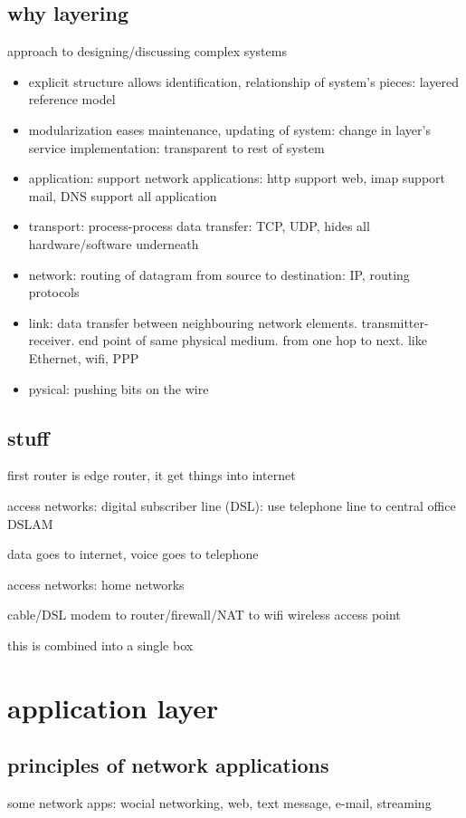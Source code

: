\documentclass[10pt]{article}
\theoremstyle{break}
\begin{document}
\subsection{why layering}
approach to designing/discussing complex systems 
\begin{itemize}
    \item explicit structure allows identification, relationship of system's pieces: layered reference model 
    \item modularization eases maintenance, updating of system: change in layer's service implementation: transparent to rest of system
\end{itemize}

\begin{itemize}
    \item application: support network applications: http support web, imap support mail, DNS support all application 
    \item transport: process-process data transfer: TCP, UDP, hides all hardware/software underneath 
    \item network: routing of datagram from source to destination: IP, routing protocols
    \item link: data transfer between neighbouring network elements. transmitter-receiver. end point of same physical medium. from one hop to next. like Ethernet, wifi, PPP
    \item pysical: pushing bits on the wire
\end{itemize}


\subsection{stuff}
first router is edge router, it get things into internet 

access networks: digital subscriber line (DSL): use telephone line to central office DSLAM 

data goes to internet, voice goes to telephone

access networks: home networks

cable/DSL modem to router/firewall/NAT to wifi wireless access point 

this is combined into a single box

\section{application layer}
\subsection{principles of network applications}
some network apps: wocial networking, web, text message, e-mail, streaming
\end{document}
